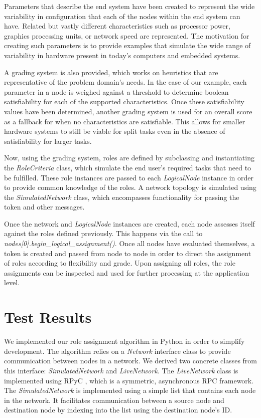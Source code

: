 \documentclass[11pt]{article}
\begin{document}
\begin{multicols}{2}
Parameters that describe the end system have been created to represent the wide variability in configuration that each of the nodes within the end system can have.  Related but vastly different characteristics such as processor power, graphics processing units, or network speed are represented.  The motivation for creating such parameters is to provide examples that simulate the wide range of variability in hardware present in today's computers and embedded systems.

A grading system is also provided, which works on heuristics that are representative of the problem domain's needs.  In the case of our example, each parameter in a node is weighed against a threshold to determine boolean satisfiability for each of the supported characteristics.  Once these satisfiability values have been determined, another grading system is used for an overall score as a fallback for when no characteristics are satisfiable.  This allows for smaller hardware systems to still be viable for split tasks even in the absence of satisfiability for larger tasks.

Now, using the grading system, roles are defined by subclassing and instantiating the \textit{RoleCriteria} class, which simulate the end user's required tasks that need to be fulfilled. These role instances are passed to each \textit{LogicalNode} instance in order to provide common knowledge of the roles. A network topology is simulated using the \textit{SimulatedNetwork} class, which encompasses functionality for passing the token and other messages.

Once the network and \textit{LogicalNode} instances are created, each node assesses itself against the roles defined previously. This happens via the call to \textit{nodes[0].begin\_logical\_assignment()}. Once all nodes have evaluated themselves, a token is created and passed from node to node in order to direct the assignment of roles according to flexibility and grade. Upon assigning all roles, the role assignments can be inspected and used for further processing at the application level.
\vfill
\section{Test Results}

We implemented our role assignment algorithm in Python in order to simplify development. The algorithm relies on a \textit{Network} interface class to provide communication between nodes in a network. We derived two concrete classes from this interface: \textit{SimulatedNetwork} and \textit{LiveNetwork}. The \textit{LiveNetwork} class is implemented using RPyC \cite{rpyc}, which is a symmetric, asynchronous RPC framework. The \textit{SimulatedNetwork} is implemented using a simple list that contains each node in the network. It facilitates communication between a source node and destination node by indexing into the list using the destination node's ID.


\end{multicols}
\end{document}

